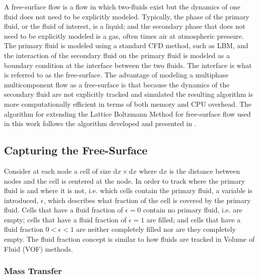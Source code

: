 \documentclass[pdftex,ms]{pittetd}
\begin{document}
A free-surface flow is a flow in which two-fluids exist but the dynamics of one fluid does not need to be explicitly modeled.
Typically, the phase of the primary fluid, or the fluid of interest, is a liquid; and the secondary phase that does not need to be explicitly modeled is a gas, often times air at atmospheric pressure.
The primary fluid is modeled using a standard CFD method, such as LBM, and the interaction of the secondary fluid on the primary fluid is modeled as a boundary condition at the interface between the two fluids.
The interface is what is referred to as the free-surface.
The advantage of modeling a multiphase multicomponent flow as a free-surface is that because the dynamics of the secondary fluid are not explicitly tracked and simulated the resulting algorithm is more computationally efficient in terms of both memory and CPU overhead.
The algorithm for extending the Lattice Boltzmann Method for free-surface flow used in this work follows the algorithm developed and presented in \citet{korner2005lattice,thurey2005interactive}.

\subsection{Capturing the Free-Surface}

Consider at each node a cell of size $\text{d}x \times \text{d}x$ where $\text{d}x$ is the distance between nodes and the cell is centered at the node.
In order to track where the primary fluid is and where it is not, i.e. which cells contain the primary fluid, a variable is introduced, $\epsilon$, which describes what fraction of the cell is covered by the primary fluid.
Cells that have a fluid fraction of $\epsilon = 0$ contain no primary fluid, i.e. are empty; cells that have a fluid fraction of $\epsilon = 1$ are filled; and cells that have a fluid fraction $0 < \epsilon < 1$ are neither completely filled nor are they completely empty.
The fluid fraction concept is similar to how fluids are tracked in Volume of Fluid (VOF) methods.

\subsubsection{Mass Transfer}
\end{document}
